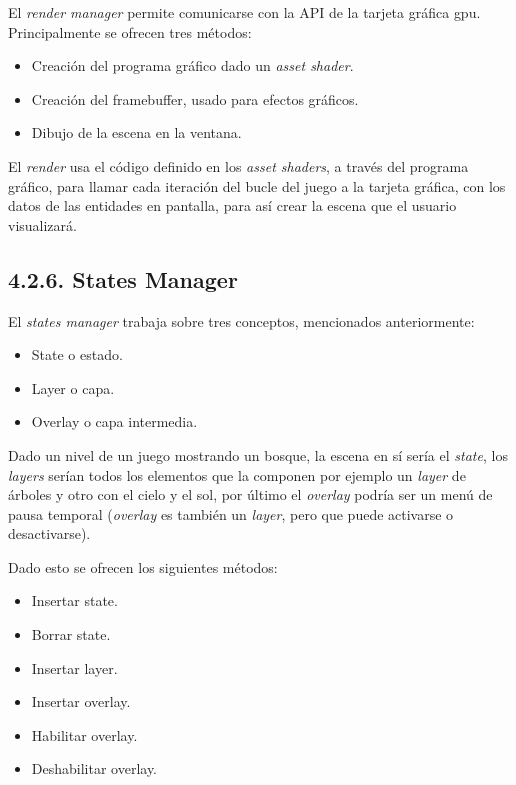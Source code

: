 El \textit{render manager} permite comunicarse con la API de la tarjeta gráfica \gls{gpu}.
Principalmente se ofrecen tres métodos:
\begin{itemize}
    \item Creación del programa gráfico dado un \textit{asset shader}.
    \item Creación del framebuffer, usado para efectos gráficos.
    \item Dibujo de la escena en la ventana.
\end{itemize}
El \textit{render} usa el código definido en los \textit{asset shaders}\cite{shaders}, a través del programa gráfico,
para llamar cada iteración del bucle del juego a la tarjeta gráfica, con los datos de las 
entidades en pantalla, para así crear la escena que el usuario visualizará.

\subsection*{4.2.6. States Manager}\label{sec:workflow_managers_states}

El \textit{states manager} trabaja sobre tres conceptos, mencionados anteriormente:
\begin{itemize}
    \item State o estado.
    \item Layer o capa.
    \item Overlay o capa intermedia.
\end{itemize}
Dado un nivel de un juego mostrando un bosque, la escena en sí sería el \textit{state}, los \textit{layers} serían todos los elementos que la componen
por ejemplo un \textit{layer} de árboles y otro con el cielo y el sol, por último el \textit{overlay} podría ser un menú de pausa
temporal (\textit{overlay} es también un \textit{layer}, pero que puede activarse o desactivarse).

Dado esto se ofrecen los siguientes métodos:
\begin{itemize}
    \item Insertar state.
    \item Borrar state.
    \item Insertar layer.
    \item Insertar overlay.
    \item Habilitar overlay.
    \item Deshabilitar overlay.
\end{itemize}

